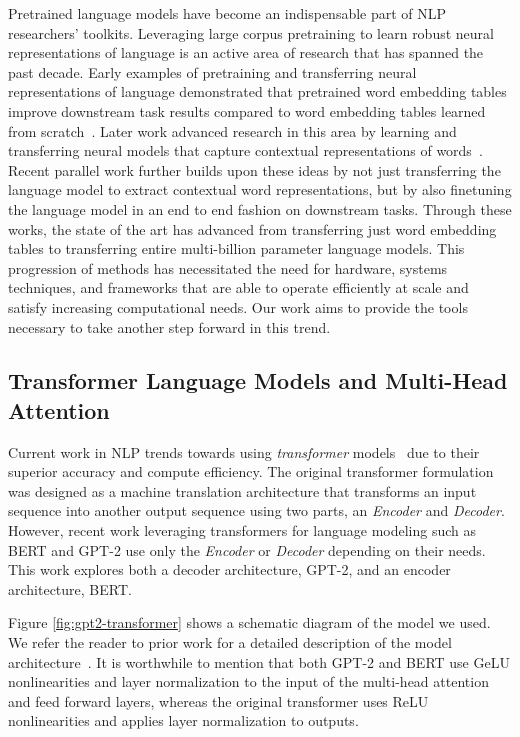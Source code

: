 Pretrained language models have become an indispensable part of NLP researchers' toolkits. Leveraging large corpus pretraining to learn robust neural representations of language is an active area of research that has spanned the past decade. Early examples of pretraining and transferring neural representations of language demonstrated that pretrained word embedding tables improve downstream task results compared to word embedding tables learned from scratch~\cite{Mikolov2013,Pennington2014,Turian2010}. Later work advanced research in this area by learning and transferring neural models that capture contextual representations of words~\citep{context2vec, Cove, ELMo, Radford2017Sentiment, Radford2019GPT2}. Recent parallel work \citep{Le2016seq2seqtransfer, Howard2018ULMFIT, Radford2018GPT, devlin2018bert, roberta, transformerxl,xlnet,mtdnn,ALBERT2019} further builds upon these ideas by not just transferring the language model to extract contextual word representations, but by also finetuning the language model in an end to end fashion on downstream tasks. Through these works, the state of the art has advanced from transferring just word embedding tables to transferring entire multi-billion parameter language models. This progression of methods has necessitated the need for hardware, systems techniques, and frameworks that are able to operate efficiently at scale and satisfy increasing computational needs. Our work aims to provide the tools necessary to take another step forward in this trend.

\subsection{Transformer Language Models and Multi-Head Attention} 

Current work in NLP trends towards using {\it transformer} models~\cite{Transformer} due to their superior accuracy and compute efficiency. The original transformer formulation was designed as a machine translation architecture that transforms an input sequence into another output sequence using two parts, an {\it Encoder} and {\it Decoder}. However, recent work leveraging transformers for language modeling such as BERT \cite{devlin2018bert} and GPT-2 \cite{Radford2019GPT2} use only the {\it Encoder} or {\it Decoder} depending on their needs. This work explores both a decoder architecture, GPT-2, and an encoder architecture, BERT. 

Figure \ref{fig:gpt2-transformer} shows a schematic diagram of the model we used. We refer the reader to prior work for a detailed description of the model architecture~\citep{Transformer,devlin2018bert,Radford2019GPT2}. It is worthwhile to mention that both GPT-2 and BERT use GeLU \citep{gelu} nonlinearities and layer normalization \citep{layernorm} to the input of the multi-head attention and feed forward layers, whereas the original transformer \citep{Transformer} uses ReLU nonlinearities and applies layer normalization to outputs.

